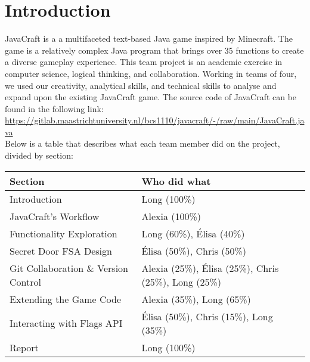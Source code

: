 \section{Introduction} \label{section: introduction}
JavaCraft is a a multifaceted text-based Java game inspired by Minecraft. The game is a relatively complex Java program that brings over 35 functions to create a diverse gameplay experience. This team project is an academic exercise in computer science, logical thinking, and collaboration. Working in teams of four, we used our creativity, analytical skills, and technical skills to analyse and expand upon the existing JavaCraft game. The source code of JavaCraft can be found in the following link: \url{https://gitlab.maastrichtuniversity.nl/bcs1110/javacraft/-/raw/main/JavaCraft.java} \\

Below is a table that describes what each team member did on the project, divided by section:

\begin{center}
    \begin{tabular}{ l l }
     Section & Who did what\\
     \hline
     Introduction & Long (100\%)\\  
     JavaCraft's Workflow & Alexia (100\%) \\
     Functionality Exploration & Long (60\%), Élisa (40\%) \\
     Secret Door FSA Design & Élisa (50\%), Chris (50\%) \\
     Git Collaboration \& Version Control & Alexia (25\%), Élisa (25\%), Chris (25\%), Long (25\%) \\
     Extending the Game Code & Alexia (35\%), Long (65\%) \\
     Interacting with Flags API & Élisa (50\%), Chris (15\%), Long (35\%) \\
     Report & Long (100\%) \\ 
    \end{tabular}
\end{center}
